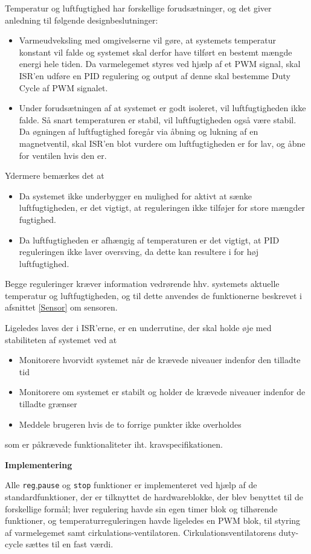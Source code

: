 Temperatur og luftfugtighed har forskellige forudsætninger, og det giver anledning til følgende designbeslutninger:
\begin{itemize}
\item Varmeudveksling med omgivelserne vil gøre, at systemets temperatur konstant vil falde og systemet skal derfor have tilført en bestemt mængde energi hele tiden. Da varmelegemet styres ved hjælp af et PWM signal, skal ISR'en udføre en PID regulering og output af denne skal bestemme Duty Cycle af PWM signalet. 
\item Under forudsætningen af at systemet er godt isoleret, vil luftfugtigheden ikke falde. Så snart temperaturen er stabil, vil luftfugtigheden også være stabil. Da øgningen af luftfugtighed foregår via åbning og lukning af en magnetventil, skal ISR'en blot vurdere om luftfugtigheden er for lav, og åbne for ventilen hvis den er.
\end{itemize}
Ydermere bemærkes det at
\begin{itemize}
\item Da systemet ikke underbygger en mulighed for aktivt at sænke luftfugtigheden, er det vigtigt, at reguleringen ikke tilføjer for store mængder fugtighed.
\item Da luftfugtigheden er afhængig af temperaturen er det vigtigt, at PID reguleringen ikke laver oversving, da dette kan resultere i for høj luftfugtighed.
\end{itemize}
\clearpage
Begge reguleringer kræver information vedrørende hhv. systemets aktuelle temperatur og luftfugtigheden, og til dette anvendes de funktionerne beskrevet i afsnittet \ref{Sensor} om sensoren.

Ligeledes laves der i ISR'erne, er en underrutine, der skal holde øje med stabiliteten af systemet ved at

\begin{itemize}
\item Monitorere hvorvidt systemet når de krævede niveauer indenfor den tilladte tid
\item Monitorere om systemet er stabilt og holder de krævede niveauer indenfor de tilladte grænser
\item Meddele brugeren hvis de to forrige punkter ikke overholdes
\end{itemize}

som er påkrævede funktionaliteter iht. kravspecifikationen.


\textbf{Implementering}

Alle \texttt{reg},\texttt{pause} og \texttt{stop} funktioner er implementeret ved hjælp af de standardfunktioner, der er tilknyttet de hardwareblokke, der blev benyttet til de forskellige formål; hver regulering havde sin egen timer blok og tilhørende funktioner, og temperaturreguleringen havde ligeledes en PWM blok, til styring af varmelegemet samt cirkulations-ventilatoren. Cirkulationsventilatorens duty-cycle sættes til en fast værdi.

